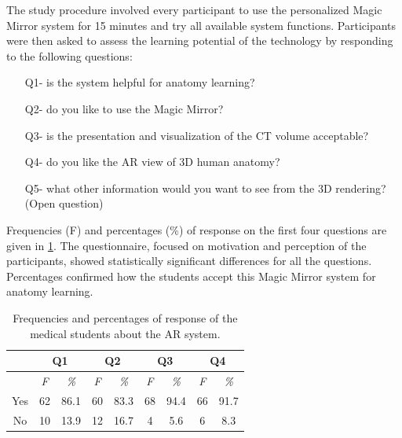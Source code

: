 {{{{{The study procedure involved every participant to use the personalized Magic Mirror system for 15 minutes and try all available system functions. Participants were then asked to assess the learning potential of the technology by responding to the following questions:
\begin{itemize}
	\item[Q1-] is the system helpful for anatomy learning?  
	\item[Q2-] do you like to use the Magic Mirror? 
	\item[Q3-] is the presentation and visualization of the CT volume acceptable? 
	\item[Q4-] do you like the AR view of 3D human anatomy? 
	\item[Q5-] what other information would you want to see from the 3D rendering? (Open question)
\end{itemize}
Frequencies (F) and percentages (\%) of response on the first four questions are given in \tablename{\ref{tb:3-MMC:userStudy}}. The questionnaire, focused on motivation and perception of the participants, showed statistically significant differences for all the questions. Percentages confirmed how the students accept this Magic Mirror system for anatomy learning.
\begin{table}
	\caption[User study with fresh medical students]{Frequencies and percentages of response of the medical students about the AR system.}
	\centering
	\label{tb:3-MMC:userStudy}
	\scriptsize
	\begin{center}
		\begin{tabular}{ccccccccc}
			\multicolumn{1}{c}{\space} & \multicolumn{2}{c}{\textbf{Q1}} & \multicolumn{2}{c}{\textbf{Q2}} & \multicolumn{2}{c}{\textbf{Q3}} & \multicolumn{2}{c}{\textbf{Q4}} \\
			\hline
			\space & \textit{F} &\textit{\%}& \textit{F} &\textit{\%}& \textit{F} &\textit{\%}& \textit{F} &\textit{\%} \\
			Yes & 62 & 86.1 & 60 & 83.3 & 68 & 94.4 & 66 & 91.7 \\
			No & 10 & 13.9 & 12 & 16.7 & 4 & 5.6 & 6 & 8.3 \\
			\hline
		\end{tabular}
	\end{center}
\end{table}

}}}}}
